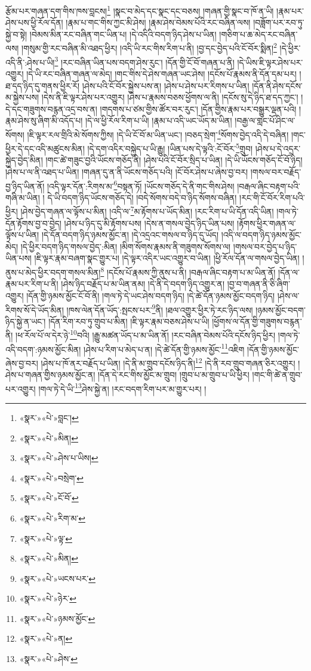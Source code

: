 རྩོམ་པར་གཞན་དག་གིས་ཁས་བླངས།\footnote{«སྣར་»«པེ་»བླང་།} །སྣང་བ་མེད་དང་སྣང་དང་བཅས། །གཞན་གྱི་སྣང་བ་ཁོ་ན་ཡི། །རྣམ་པར་ཤེས་པས་ཕྱི་རོལ་དོན། །རྣམ་པ་གང་གིས་ཀྱང་མི་ཤེས། །རྣམ་ཤེས་བེམས་པོའི་རང་བཞིན་ལས། །བཟློག་པར་རབ་ཏུ་སྐྱེ་བ་སྟེ། །བེམས་མིན་རང་བཞིན་གང་ཡིན་པ། །དེ་འདིའི་བདག་ཉིད་ཤེས་པ་ཡིན། །གཅིག་པ་ཆ་མེད་རང་བཞིན་ལས། །གསུམ་གྱི་རང་བཞིན་མི་འཐད་ཕྱིར། །འདི་ཡི་རང་གིས་རིག་པ་ནི། །བྱ་དང་བྱེད་པའི་ངོ་བོར་སྨིན།\footnote{«སྣར་»«པེ་»མིན།} །དེ་ཕྱིར་འདི་ནི་:ཤེས་པ་ཡི།\footnote{«སྣར་»«པེ་»ཤེས་པ་ཡིས།} །རང་བཞིན་ཡིན་པས་བདག་ཤེས་རུང་། །དོན་གྱི་ངོ་བོ་གཞན་པ་ནི། །དེ་ཡིས་ཇི་ལྟར་ཤེས་པར་འགྱུར། །དེ་ཡི་རང་བཞིན་གཞན་ལ་མེད། །གང་གིས་དེ་ཤེས་གཞན་ཡང་ཤེས། །དངོས་པོ་རྣམས་ནི་དོན་དམ་པར། །ཐ་དད་ཉིད་དུ་གནས་ཕྱིར་རོ། །ཤེས་པའི་ངོ་བོར་སྐྱེས་པས་ན། །ཤེས་པ་ཤེས་པར་རིགས་པ་ཡིན། །དོན་ནི་ཤེས་དངོས་མ་སྐྱེས་པས། །དེས་ནི་ཇི་ལྟར་ཤེས་པར་འགྱུར། །ཤེས་པ་རྣམས་བཅས་ཕྱོགས་ལ་ནི། །དངོས་སུ་དེ་ཉིད་ཐ་དད་ཀྱང་། །དེ་དང་གཟུགས་བརྙན་འདྲ་བས་ན། །གདགས་པ་ཙམ་གྱིས་ཚོར་བར་རུང་། །དོན་གྱིས་རྣམ་པར་བསྒྱུར་ལྡན་པའི། །རྣམ་ཤེས་སུ་ཞིག་མི་འདོད་པ། །དེ་ལ་ཕྱི་རོལ་རིག་པ་ཡི། །རྣམ་པ་འདི་ཡང་ཡོད་མ་ཡིན། །བརྒྱ་ལ་གླང་པོ་ཤིང་ལ་སོགས། །ཇི་ལྟར་རལ་གྲིའི་མེ་སོགས་ཀྱིས། །དེ་ཡི་ངོ་བོ་མ་ཡིན་ཡང་། །བཅད་སྲེག་\footnote{«སྣར་»«པེ་»བསྲེག་}སོགས་བྱེད་འདི་དེ་བཞིན། །གང་ཕྱིར་དེ་དང་འདི་མཚུངས་མིན། །དེ་དག་འདིར་བསྐྱེད་པ་ཡི་རྒྱུ། །ཡིན་པས་དེ་ལྟའི་:ངོ་བོར་\footnote{«སྣར་»«པེ་»ངོ་བོ་}གྲུབ། །ཤེས་པ་དེ་འདྲར་སྐྱེད་བྱེད་མིན། །གང་ཚེ་གཟུང་བྱའི་ཡོངས་གཅོད་ནི། །ཤེས་པའི་ངོ་བོར་སྲིད་པ་ཡིན། །དེ་ཡི་ཡོངས་གཅོད་ངོ་བོ་ཉིད། །ཤེས་པ་ལ་ནི་འཐད་པ་ཡིན། །གཞན་དུ་ན་ནི་ཡོངས་གཅོད་པའི། །ངོ་བོར་ཤེས་པ་ཞེས་བྱ་བར། །གསལ་བར་བརྗོད་བྱ་ཉིད་ཡིན་ནོ། །འདི་ལྟར་དོན་:རིགས་མ་\footnote{«སྣར་»«པེ་»རིག་མ་}བསྟན་ཏོ། །ཡོངས་གཅོད་དེ་ནི་གང་གིས་ཤེས། །བརྒལ་ཞིང་བརྟག་པའི་གཞི་མ་ཡིན། །
དེ་ཡི་བདག་ཉིད་ཡོངས་གཅོད་དེ། །བདེ་སོགས་བདེ་བ་ཉིད་སོགས་བཞིན། །རང་གི་ངོ་བོར་རིག་པའི་ཕྱིར། །ཤེས་བྱེད་གཞན་ལ་ལྟོས་པ་མིན། །འདི་ལ་\footnote{«སྣར་»«པེ་»ལྟ་}མ་རྟོགས་པ་ཡོད་མིན། །རང་རིག་པ་ཡི་དོན་འདི་ཡིན། །གལ་ཏེ་དོན་རྟོགས་བྱ་བ་བྱེད། །ཤེས་པ་ཉིད་དུ་མི་རྟོགས་པས། །དེས་ན་གསལ་བྱེད་ཉིད་ཡིན་པས། །རྟོགས་ཕྱིར་གཞན་ལ་ལྟོས་པ་ཡིན། །དེ་དོན་བདག་ཉིད་ཉམས་མྱོང་ན། །དེ་འདྲའང་གསལ་བ་ཉིད་དུ་ཡོད། །འདི་ལ་བདག་ཉིད་ཉམས་མྱོང་མེད། །དེ་ཕྱིར་བདག་ཉིད་གསལ་བྱེད་:མིན། །མིག་སོགས་རྣམས་ནི་གཟུགས་སོགས་ལ། །གསལ་བར་བྱེད་པ་ཉིད་ཡིན་པས། །ཇི་ལྟར་རྣམ་བཞག་སྣང་གྱུར་པ། །དེ་ལྟར་འདིར་ཡང་འགྱུར་བ་ཡིན། །ཕྱི་རོལ་དོན་ལ་གསལ་བྱེད་ཡིན། །ནུས་པ་མེད་ཕྱིར་བདག་གསལ་མིན།\footnote{«སྣར་»«པེ་»མིན།} །དངོས་པོ་རྣམས་ཀྱི་ནུས་པ་ནི། །བརྒལ་ཞིང་བརྟག་པ་མ་ཡིན་ནོ། །དོན་ལ་རྣམ་པར་རིག་པ་ནི། །ཤེས་ཉིད་བརྗོད་པ་མ་ཡིན་ནམ། །དེ་ནི་དེ་བདག་ཉིད་འགྱུར་ན། །བྱ་བ་གཞན་ནི་ཅི་ཞིག་འགྱུར། །དོན་གྱི་ཉམས་མྱོང་ངོ་བོ་ནི། །གལ་ཏེ་དེ་ཡང་ཤེས་བདག་ཉིད། །དེ་ཚེ་དོན་ཉམས་མྱོང་བདག་ཉིད། །ཤེས་ལ་རིགས་སོ་དེ་ཡོད་མིན། །ཁས་ལེན་དོན་ཡོད་:སྤངས་པར་\footnote{«སྣར་»«པེ་»ཡངས་པར་}ནི། །ཐལ་འགྱུར་ཕྱིར་ཏེ་རང་ཉིད་ལས། །ཉམས་མྱོང་བདག་ཉིད་སྐྱེ་ན་ཡང་། །དོན་རིག་རབ་ཏུ་གྲུབ་པ་མིན། །ཇི་ལྟར་རྣམ་བཅས་ཤེས་པ་ཡི། །ཕྱོགས་ལ་དོན་གྱི་གཟུགས་བརྙན་ནི། །ཕ་རོལ་པོ་ལ་དེར་ཉེ་\footnote{«སྣར་»«པེ་»ཉེར་}བའི། །རྒྱུ་མཚན་ཡོད་པ་མ་ཡིན་ནོ། །རང་བཞིན་བེམས་པོའི་དངོས་ཉིད་ཕྱིར། །གལ་ཏེ་འདི་བདག་:ཉམས་མྱོང་མིན། །ཤེས་པ་རིག་པ་མེད་པ་ན། །དེ་ཚེ་དོན་གྱི་ཉམས་མྱོང་\footnote{«སྣར་»«པེ་»ཉམས་མྱོང་}འཇིག །དོན་གྱི་ཉམས་མྱོང་ཞེས་བྱ་བར། །ཤེས་པ་ཁོ་ནར་བརྗོད་པ་ཡིན། །དེ་ནི་མ་གྲུབ་དངོས་ཉིད་ནི།\footnote{«སྣར་»«པེ་»ན།} །དེ་ནི་རབ་གྲུབ་གཞན་ཅིར་འགྱུར། །ཤེས་པ་གཞན་གྱིས་ཉམས་མྱོང་ན། །དོན་དེ་རང་གིས་མྱོང་མ་གྲུབ། །གྲུབ་པ་མ་གྲུབ་པ་ཡི་ཕྱིར། །གང་གི་ཚེ་ན་གྲུབ་པར་འགྱུར། །གལ་ཏེ་དེ་ཡི་\footnote{«སྣར་»«པེ་»ཤེས་}ཤེས་སྐྱེ་ན། །རང་བདག་རིག་པར་མ་གྱུར་པར། །
